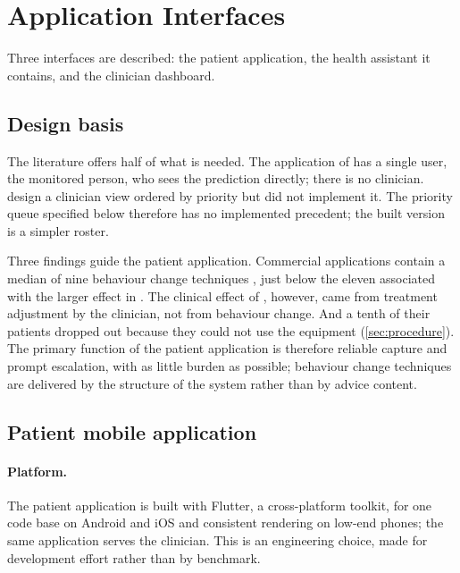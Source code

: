 
\section{Application Interfaces}\label{sec:interfaces}

Three interfaces are described: the patient application, the health assistant it contains, and the clinician dashboard.

\subsection{Design basis}\label{sec:corpus-gap}\label{sec:app-argument}

The literature offers half of what is needed. The application of \textcite{efendi2025} has a single user, the monitored person, who sees the prediction directly; there is no clinician. \Textcite{yazdani2018} design a clinician view ordered by priority but did not implement it. The priority queue specified below therefore has no implemented precedent; the built version is a simpler roster.

Three findings guide the patient application. Commercial applications contain a median of nine behaviour change techniques \parencite{alessa2019}, just below the eleven associated with the larger effect in \textcite{zhou2024}. The clinical effect of \textcite{mihevc2025}, however, came from treatment adjustment by the clinician, not from behaviour change. And a tenth of their patients dropped out because they could not use the equipment (\cref{sec:procedure}). The primary function of the patient application is therefore reliable capture and prompt escalation, with as little burden as possible; behaviour change techniques are delivered by the structure of the system rather than by advice content.

\subsection{Patient mobile application}\label{sec:patient-app}\label{sec:platform}\label{sec:manual-entry}\label{sec:trends}\label{sec:bct-mapping}\label{sec:app-notifications}\label{sec:device-spec}

\paragraph{Platform.} The patient application is built with Flutter, a cross-platform toolkit, for one code base on Android and iOS and consistent rendering on low-end phones; the same application serves the clinician. This is an engineering choice, made for development effort rather than by benchmark.

